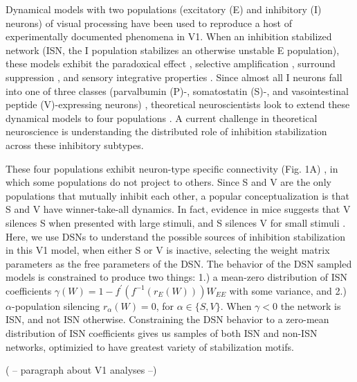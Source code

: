 Dynamical models with two populations (excitatory (E) and inhibitory (I) neurons) of visual processing have been used to reproduce a host of experimentally documented phenomena in V1.   When an inhibition stabilized network (ISN, the I population stabilizes an otherwise unstable E population), these models exhibit the paradoxical effect \cite{tsodyks1997paradoxical}, selective amplification \cite{murphy2009balanced}, surround suppression \cite{ozeki2009inhibitory}, and  sensory integrative properties \cite{rubin2015stabilized}.  Since almost all I neurons fall into one of three classes (parvalbumin (P)-, somatostatin (S)-, and vasointestinal peptide (V)-expressing neurons) \cite{markram2004interneurons, rudy2011three}, theoretical neuroscientists look to extend these dynamical models to four populations \cite{litwin2016inhibitory}.  A current challenge in theoretical neuroscience is understanding the distributed role of inhibition stabilization across these inhibitory subtypes.  

These four populations exhibit neuron-type specific connectivity (Fig. 1A) \cite{pfeffer2013inhibition}, in which some populations do not project to others.  Since S and V are the only populations that mutually inhibit each other, a popular conceptualization is that S and V have winner-take-all dynamics.  In fact, evidence in mice suggests that V silences S when presented with large stimuli, and S silences V for small stimuli \cite{dipoppa2018vision}.  Here, we use DSNs to understand the possible sources of inhibition stabilization in this V1 model, when either S or V is inactive, selecting the weight matrix parameters as the free parameters of the DSN.  The behavior of the DSN sampled models is constrained to produce two things: 1.) a mean-zero distribution of ISN coefficients $\gamma(W) = 1 - f^{'}(f^{-1}(r_E(W)))W_{EE}$ with some variance, and 2.) $\alpha$-population silencing $r_\alpha(W) = 0$, for $\alpha \in \{ S, V \}$.  When $\gamma < 0$ the network is ISN, and not ISN otherwise.  Constraining the DSN behavior to a zero-mean distribution of ISN coefficients gives us samples of both ISN and non-ISN networks, optimizied to have greatest variety of stabilization motifs.

( -- paragraph about V1 analyses --)

